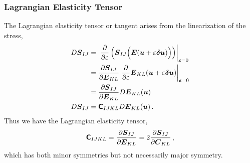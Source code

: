 \documentclass[10pt,letterpaper,oneside]{report}
\newcommand{\ten}[1]{\mbox{\boldmath $#1$}{}}
\newcommand{\tenf}[1]{\mbox{{\sffamily{\bfseries {#1}}}}}
\newcommand{\tens}[1]{\mbox{\boldmath{\scriptsize{$#1$}}}{}}
\begin{document}
\subsubsection{Lagrangian Elasticity Tensor}
The Lagrangian elasticity tensor or tangent arises from the linearization of the stress, 
\begin{align}
D \ten{S}_{IJ} ={}& \left. \frac{\partial }{\partial \varepsilon} \left( \ten{S}_{IJ} \Big( \ten{E} (\ten{u} + \varepsilon \ten{\delta u} ) \Big) \right) \right|_{\tens{\varepsilon} = 0} 
\\
={}& \frac{ \partial \ten{S}_{IJ} }{ \partial \ten{E}_{KL} } \left. \frac{\partial }{\partial \varepsilon} \ten{E}_{KL} (\ten{u} + \varepsilon \ten{\delta u} ) \right|_{\tens{\varepsilon} = 0} 
\notag \\
={}& \frac{ \partial \ten{S}_{IJ} }{ \partial \ten{E}_{KL} }  D \ten{E}_{KL} (\ten{u} ) 
\notag \\
D \ten{S}_{IJ} ={}& \tenf{C}_{IJKL} D \ten{E}_{KL} (\ten{u} ) \, . 
\end{align}
Thus we have the Lagrangian elasticity tensor, 
\begin{equation}
\tenf{C}_{IJKL} = \frac{ \partial \ten{S}_{IJ} }{ \partial \ten{E}_{KL} } = 2 \frac{ \partial \ten{S}_{IJ} }{ \partial \ten{C}_{KL} } \, , 
\end{equation}
which has both minor symmetries but not necessarily major symmetry.  
\end{document}
